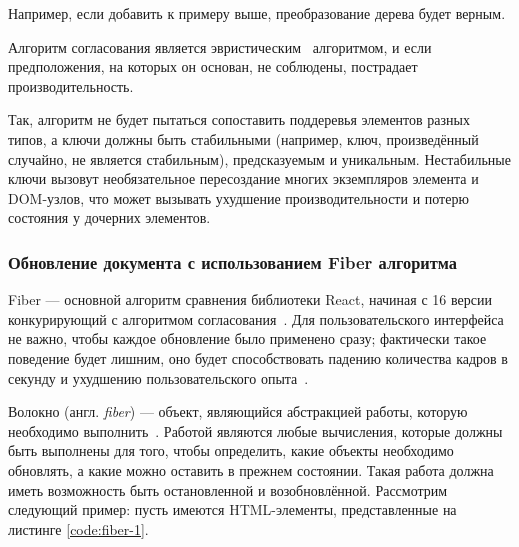 Например, если добавить  к примеру выше, преобразование дерева будет верным.
\newline


Алгоритм согласования является эвристическим~\cite{euristic} алгоритмом, и если предположения, на которых он основан, не соблюдены, пострадает производительность.

Так, алгоритм не будет пытаться сопоставить поддеревья элементов разных типов, а ключи должны быть стабильными (например, ключ, произведённый случайно, не является стабильным), предсказуемым и уникальным.
Нестабильные ключи вызовут необязательное пересоздание многих экземпляров элемента и DOM-узлов, что может вызывать ухудшение производительности и потерю состояния у дочерних элементов.


\subsubsection{Обновление документа с использованием Fiber алгоритма}

Fiber --- основной алгоритм сравнения библиотеки React, начиная с 16 версии конкурирующий с алгоритмом согласования~\cite{fiber}. Для пользовательского интерфейса не важно, чтобы каждое обновление было применено сразу; фактически такое поведение будет лишним, оно будет способствовать падению количества кадров в секунду и ухудшению пользовательского опыта~\cite{react-dive}. 

Волокно (англ. \textit{fiber}) --- объект, являющийся абстракцией работы, которую необходимо выполнить~\cite{react-dive}. Работой являются любые вычисления, которые должны быть выполнены для того, чтобы определить, какие объекты необходимо обновлять, а какие можно оставить в прежнем состоянии. Такая работа должна иметь возможность быть остановленной и возобновлённой. Рассмотрим следующий пример: пусть имеются HTML-элементы, представленные на листинге \ref{code:fiber-1}.


